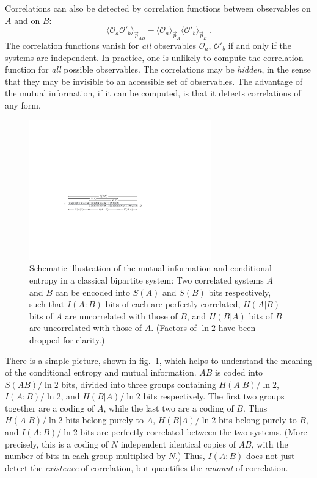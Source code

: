 \documentclass[11pt]{article}
\newcommand{\ev}[1]{\langle{#1}\rangle}
\newcommand{\OO}{\mathcal{O}}
\begin{document}
Correlations can also be detected by correlation functions between observables on $A$ and on $B$:
\begin{equation}
\ev{\OO_a\OO'_b}_{\vec p_{AB}}-\ev{\OO_a}_{\vec p_A}\ev{\OO'_b}_{\vec p_B}\,.
\end{equation}
The correlation functions vanish for \emph{all} observables $\OO_a$, $\OO'_b$ if and only if the systems are independent. In practice, one is unlikely to compute the correlation function for \emph{all} possible observables. The correlations may be \emph{hidden}, in the sense that they may be invisible to an accessible set of observables. The advantage of the mutual information, if it can be computed, is that it detects correlations of any form.

\begin{figure}[tbp]
\centering
\includegraphics[width=0.7\textwidth]{figs/MIclassical.pdf}
\caption{\label{fig:MIclassical}
Schematic illustration of the mutual information and conditional entropy in a classical bipartite system: Two correlated systems $A$ and $B$ can be encoded into $S(A)$ and $S(B)$ bits respectively, such that $I(A:B)$ bits of each are perfectly correlated, $H(A|B)$ bits of $A$ are uncorrelated with those of $B$, and $H(B|A)$ bits of $B$ are uncorrelated with those of $A$. (Factors of $\ln2$ have been dropped for clarity.)
}
\end{figure}

There is a simple picture, shown in fig.\ \ref{fig:MIclassical}, which helps to understand the meaning of the conditional entropy and mutual information. $AB$ is coded into $S(AB)/\ln 2$ bits, divided into three groups containing $H(A|B)/\ln2$, $I(A:B)/\ln2$, and $H(B|A)/\ln2$ bits respectively. The first two groups together are a coding of $A$, while the last two are a coding of $B$. Thus $H(A|B)/\ln2$ bits belong purely to $A$, $H(B|A)/\ln2$ bits belong purely to $B$, and $I(A:B)/\ln2$ bits are perfectly correlated between the two systems. (More precisely, this is a coding of $N$ independent identical copies of $AB$, with the number of bits in each group multiplied by $N$.) Thus, $I(A:B)$ does not just detect the \emph{existence} of correlation, but quantifies the \emph{amount} of correlation.
\end{document}
